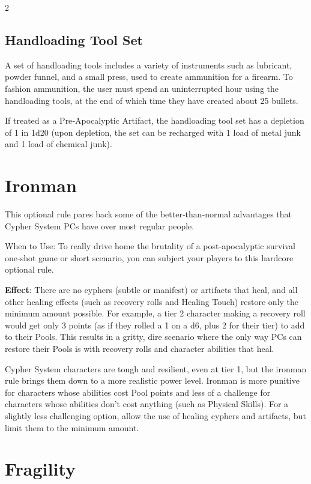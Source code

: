 \begin{multicols}{2}

\subsection{Handloading Tool Set}

A set of handloading tools includes a variety of instruments such as lubricant, powder funnel, and a small press, used to create ammunition for a firearm. To fashion ammunition, the user must spend an uninterrupted hour using the handloading tools, at the end of which time they have created about 25 bullets.

If treated as a Pre‑Apocalyptic Artifact, the handloading tool set has a depletion of 1 in 1d20 (upon depletion, the set can be recharged with 1 load of metal junk and 1 load of chemical junk).

\section{Ironman}

This optional rule pares back some of the better‑than‑normal advantages that Cypher System PCs have over most regular people. 

When to Use: To really drive home the brutality of a post‑apocalyptic survival one‑shot game or short scenario, you can subject your players to this hardcore optional rule. 

\textbf{Effect}: There are no cyphers (subtle or manifest) or artifacts that heal, and all other healing effects (such as recovery rolls and Healing Touch) restore only the minimum amount possible. For example, a tier 2 character making a recovery roll would get only 3 points (as if they rolled a 1 on a d6, plus 2 for their tier) to add to their Pools. This results in a gritty, dire scenario where the only way PCs can restore their Pools is with recovery rolls and character abilities that heal. 

Cypher System characters are tough and resilient, even at tier 1, but the ironman rule brings them down to a more realistic power level. Ironman is more punitive for characters whose abilities cost Pool points and less of a challenge for characters whose abilities don’t cost anything (such as Physical Skills). For a slightly less challenging option, allow the use of healing cyphers and artifacts, but limit them to the minimum amount.

\section{Fragility}


\end{multicols}
